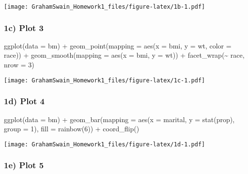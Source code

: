 \documentclass[
]{article}
\newenvironment{Shaded}{\begin{snugshade}}{\end{snugshade}}
\newcommand{\AttributeTok}[1]{\textcolor[rgb]{0.77,0.63,0.00}{#1}}
\newcommand{\DecValTok}[1]{\textcolor[rgb]{0.00,0.00,0.81}{#1}}
\newcommand{\FunctionTok}[1]{\textcolor[rgb]{0.00,0.00,0.00}{#1}}
\newcommand{\NormalTok}[1]{#1}
\newcommand{\SpecialCharTok}[1]{\textcolor[rgb]{0.00,0.00,0.00}{#1}}
\begin{document}
\texttt{[image: GrahamSwain\_Homework1\_files/figure-latex/1b-1.pdf]}

\hypertarget{c-plot-3}{%
\subsubsection{1c) Plot 3}\label{c-plot-3}}

\begin{Shaded}
\begin{Highlighting}[]
\FunctionTok{ggplot}\NormalTok{(}\AttributeTok{data =}\NormalTok{ bm) }\SpecialCharTok{+}
  \FunctionTok{geom\_point}\NormalTok{(}\AttributeTok{mapping =} \FunctionTok{aes}\NormalTok{(}\AttributeTok{x =}\NormalTok{ bmi, }\AttributeTok{y =}\NormalTok{ wt, }\AttributeTok{color =}\NormalTok{ race)) }\SpecialCharTok{+}
  \FunctionTok{geom\_smooth}\NormalTok{(}\AttributeTok{mapping =} \FunctionTok{aes}\NormalTok{(}\AttributeTok{x =}\NormalTok{ bmi, }\AttributeTok{y =}\NormalTok{ wt)) }\SpecialCharTok{+}
  \FunctionTok{facet\_wrap}\NormalTok{(}\SpecialCharTok{\textasciitilde{}}\NormalTok{ race, }\AttributeTok{nrow =} \DecValTok{3}\NormalTok{)}
\end{Highlighting}
\end{Shaded}

\texttt{[image: GrahamSwain\_Homework1\_files/figure-latex/1c-1.pdf]}

\hypertarget{d-plot-4}{%
\subsubsection{1d) Plot 4}\label{d-plot-4}}

\begin{Shaded}
\begin{Highlighting}[]
\FunctionTok{ggplot}\NormalTok{(}\AttributeTok{data =}\NormalTok{ bm) }\SpecialCharTok{+}
  \FunctionTok{geom\_bar}\NormalTok{(}\AttributeTok{mapping =} \FunctionTok{aes}\NormalTok{(}\AttributeTok{x =}\NormalTok{ marital, }\AttributeTok{y =} \FunctionTok{stat}\NormalTok{(prop), }\AttributeTok{group =} \DecValTok{1}\NormalTok{), }\AttributeTok{fill =} \FunctionTok{rainbow}\NormalTok{(}\DecValTok{6}\NormalTok{)) }\SpecialCharTok{+}
  \FunctionTok{coord\_flip}\NormalTok{()}
\end{Highlighting}
\end{Shaded}

\texttt{[image: GrahamSwain\_Homework1\_files/figure-latex/1d-1.pdf]}

\hypertarget{e-plot-5}{%
\subsubsection{1e) Plot 5}\label{e-plot-5}}
\end{document}
